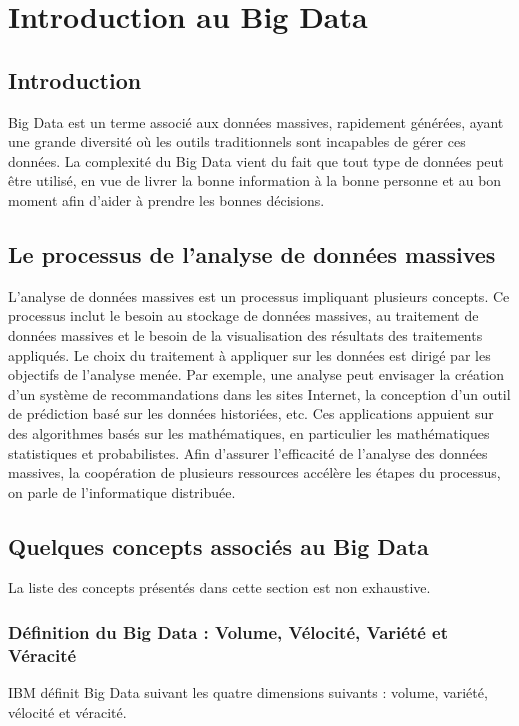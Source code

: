 \chapter{Introduction au Big Data}
	
	\section{Introduction}
		Big Data est un terme associé aux données massives, rapidement générées, ayant une grande diversité où les  outils traditionnels sont incapables de gérer ces données. La complexité du Big Data vient du fait que tout type de données peut être utilisé, en vue de livrer la bonne information à la bonne personne et au bon moment afin d'aider à prendre les bonnes décisions.
			
	\section{Le processus de l'analyse de données massives}
L'analyse de données massives 	est un processus impliquant plusieurs concepts. Ce processus inclut le besoin au stockage de données massives, au traitement de données massives et le besoin de la visualisation des résultats des traitements appliqués. Le choix du traitement à appliquer sur les données est dirigé par les objectifs de  l'analyse menée. Par exemple, une analyse peut envisager la création d'un système de recommandations dans les sites Internet, la conception d'un outil de prédiction basé sur les données historiées, etc.  Ces applications appuient sur des algorithmes basés sur les mathématiques, en particulier les mathématiques statistiques et probabilistes. Afin d'assurer l'efficacité de l'analyse des données massives, la coopération de plusieurs ressources accélère les étapes du processus, on parle de l'informatique distribuée.  


	\section{Quelques concepts associés au Big Data}

La liste des concepts présentés dans cette section est non exhaustive. 

		\subsection{Définition du Big Data : Volume, Vélocité, Variété et Véracité}
		
		IBM définit Big Data suivant les quatre dimensions suivants : volume, variété, vélocité et véracité. 
